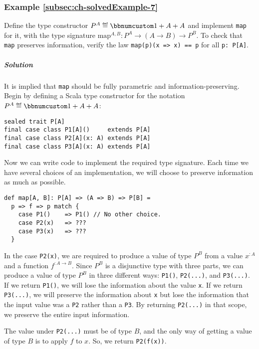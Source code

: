 \subsubsection{Example \label{subsec:ch-solvedExample-7}\ref{subsec:ch-solvedExample-7}}

Define the type constructor $P^{A}\triangleq\bbnum 1+A+A$ and implement
\lstinline!map! for it, with the type signature $\text{map}^{A,B}:P^{A}\rightarrow(A\rightarrow B)\rightarrow P^{B}$.
To check that \lstinline!map! preserves information, verify the law
\lstinline!map(p)(x => x) == p! for all \lstinline!p: P[A]!.

\subparagraph{Solution}

It is implied that \lstinline!map! should be fully parametric and
information-preserving. Begin by defining a Scala type constructor
for the notation $P^{A}\triangleq\bbnum 1+A+A$:
\begin{lstlisting}
sealed trait P[A]
final case class P1[A]()     extends P[A]
final case class P2[A](x: A) extends P[A]
final case class P3[A](x: A) extends P[A]
\end{lstlisting}
Now we can write code to implement the required type signature. Each
time we have several choices of an implementation, we will choose
to preserve information as much as possible.

\begin{lstlisting}
def map[A, B]: P[A] => (A => B) => P[B] =
  p => f => p match {
    case P1()    => P1() // No other choice.
    case P2(x)   => ???
    case P3(x)   => ???
  }
\end{lstlisting}
In the case \lstinline!P2(x)!, we are required to produce a value
of type $P^{B}$ from a value $x^{:A}$ and a function $f^{:A\rightarrow B}$.
Since $P^{B}$ is a disjunctive type with three parts, we can produce
a value of type $P^{B}$ in three different ways: \lstinline!P1()!,
\lstinline!P2(...)!, and \lstinline!P3(...)!. If we return \lstinline!P1()!,
we will lose the information about the value \lstinline!x!. If we
return \lstinline!P3(...)!, we will preserve the information about
\lstinline!x! but lose the information that
the input value was a \lstinline!P2! rather than a \lstinline!P3!.
By returning \lstinline!P2(...)! in that scope, we preserve the entire
input information. 

The value under \lstinline!P2(...)! must be of type $B$, and the
only way of getting a value of type $B$ is to apply $f$ to $x$.
So, we return \lstinline!P2(f(x))!.

